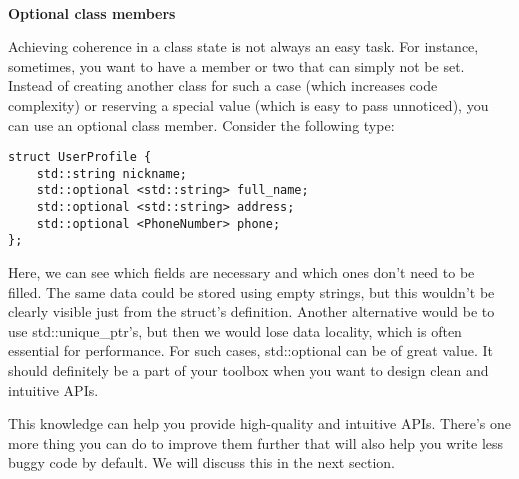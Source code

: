 \hspace*{\fill} \\ %
\noindent
\textbf{Optional class members}

Achieving coherence in a class state is not always an easy task. For instance, sometimes, you want to have a member or two that can simply not be set. Instead of creating another class for such a case (which increases code complexity) or reserving a special value (which is easy to pass unnoticed), you can use an optional class member. Consider the following type:

\begin{lstlisting}[style=styleCXX]
struct UserProfile {
	std::string nickname;
	std::optional <std::string> full_name;
	std::optional <std::string> address;
	std::optional <PhoneNumber> phone;
};
\end{lstlisting}

Here, we can see which fields are necessary and which ones don't need to be filled. The same data could be stored using empty strings, but this wouldn't be clearly visible just from the struct's definition. Another alternative would be to use std::unique\_ptr's, but then we would lose data locality, which is often essential for performance. For such cases, std::optional can be of great value. It should definitely be a part of your toolbox when you want to design clean and intuitive APIs.

This knowledge can help you provide high-quality and intuitive APIs. There's one more thing you can do to improve them further that will also help you write less buggy code by default. We will discuss this in the next section.










